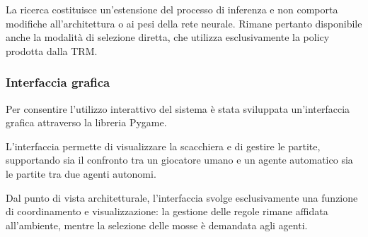 La ricerca costituisce un'estensione del processo di inferenza e non comporta modifiche all'architettura o ai pesi della rete neurale. Rimane pertanto disponibile anche la modalità di selezione diretta, che utilizza esclusivamente la policy prodotta dalla TRM.

\subsubsection{Interfaccia grafica}

Per consentire l'utilizzo interattivo del sistema è stata sviluppata un'interfaccia grafica attraverso la libreria Pygame.

L'interfaccia permette di visualizzare la scacchiera e di gestire le partite, supportando sia il confronto tra un giocatore umano e un agente automatico sia le partite tra due agenti autonomi.

Dal punto di vista architetturale, l'interfaccia svolge esclusivamente una funzione di coordinamento e visualizzazione: la gestione delle regole rimane affidata all'ambiente, mentre la selezione delle mosse è demandata agli agenti.
